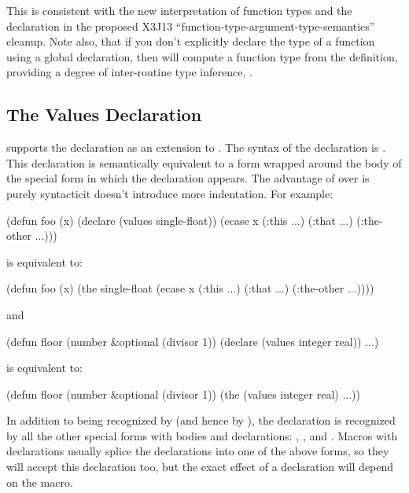 This is consistent with the new interpretation of function types and
the  declaration in the proposed X3J13
``function-type-argument-type-semantics'' cleanup.  Note also, that if
you don't explicitly declare the type of a function using a global
 declaration, then \python{} will compute a function type
from the definition, providing a degree of inter-routine type
inference, .


\subsection{The Values Declaration}

\cmucl{} supports the  declaration as an extension to
\clisp.  The syntax of the declaration is 
{}.  This
declaration is semantically equivalent to a  form wrapped
around the body of the special form in which the 
declaration appears. The advantage of  over
 is purely syntactic\dash{}it doesn't introduce more
indentation.  For example:

\begin{example}
(defun foo (x)
  (declare (values single-float))
  (ecase x
    (:this ...)
    (:that ...)
    (:the-other ...)))
\end{example}

is equivalent to:

\begin{example}
(defun foo (x)
  (the single-float
       (ecase x
         (:this ...)
         (:that ...)
         (:the-other ...))))
\end{example}

and

\begin{example}
(defun floor (number &optional (divisor 1))
  (declare (values integer real))
  ...)
\end{example}

is equivalent to:

\begin{example}
(defun floor (number &optional (divisor 1))
  (the (values integer real)
       ...))
\end{example}

In addition to being recognized by  (and hence by
), the  declaration is recognized by all the
other special forms with bodies and declarations: ,
,  and .  Macros with declarations
usually splice the declarations into one of the above forms, so they
will accept this declaration too, but the exact effect of a
 declaration will depend on the macro.

